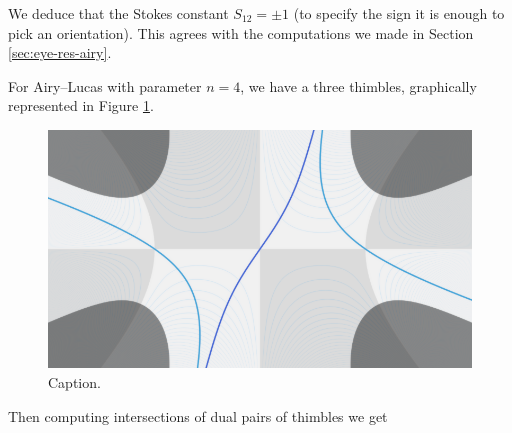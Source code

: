\documentclass{article}
\theoremstyle{definition}
\begin{document}
We deduce that the Stokes constant $S_{12}=\pm 1$ (to specify the sign it is enough to pick an orientation). This agrees with the computations we made in Section \ref{sec:eye-res-airy}.

For Airy--Lucas with parameter $n=4$, we have a three thimbles, graphically represented in Figure \ref{fig:thimble-n4}. 
\begin{figure}[ht]
    \centering
    \includegraphics[scale=0.35]{figures/thimble-n4.png}
    \caption{Caption.}
    \label{fig:thimble-n4}
\end{figure}
Then computing intersections of dual pairs of thimbles we get 
\end{document}

